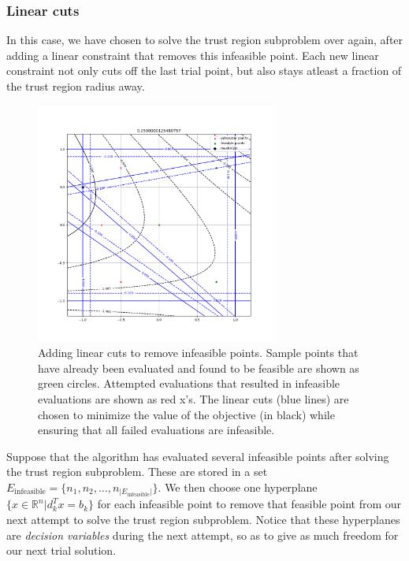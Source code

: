 \documentclass{article}
\theoremstyle{case}
\newcommand{\Rn}{\mathbb R^n}
\newcommand{\trsinfset}{{E_\text{infeasible}}}
\begin{document}
\subsubsection{Linear cuts}
In this case, we have chosen to solve the trust region subproblem over again, after adding a linear constraint that removes this infeasible point.
Each new linear constraint not only cuts off the last trial point, but also stays atleast a fraction of the trust region radius away.

\begin{figure}[h]
    \centering
    \includegraphics[width=300px]{images/pyomo_cut_solution.png}
    \caption{
		Adding linear cuts to remove infeasible points.
		Sample points that have already been evaluated and found to be feasible are shown as green circles.
		Attempted evaluations that resulted in infeasible evaluations are shown as red x's.
		The linear cuts (blue lines) are chosen to minimize the value of the objective (in black) while ensuring that all failed evaluations are infeasible.
	}
    \label{pvip}
\end{figure}


Suppose that the algorithm has evaluated several infeasible points after solving the trust region subproblem.
These are stored in a set $\trsinfset = \{n_1, n_2, \ldots, n_{|\trsinfset|}\}$.
We then choose one hyperplane $\{x \in \Rn | d_k^Tx = b_k\}$ for each infeasible point to remove that feasible point from our next attempt to solve the trust region subproblem.
Notice that these hyperplanes are \emph{decision variables} during the next attempt, so as to give as much freedom for our next trial solution.
\end{document}
